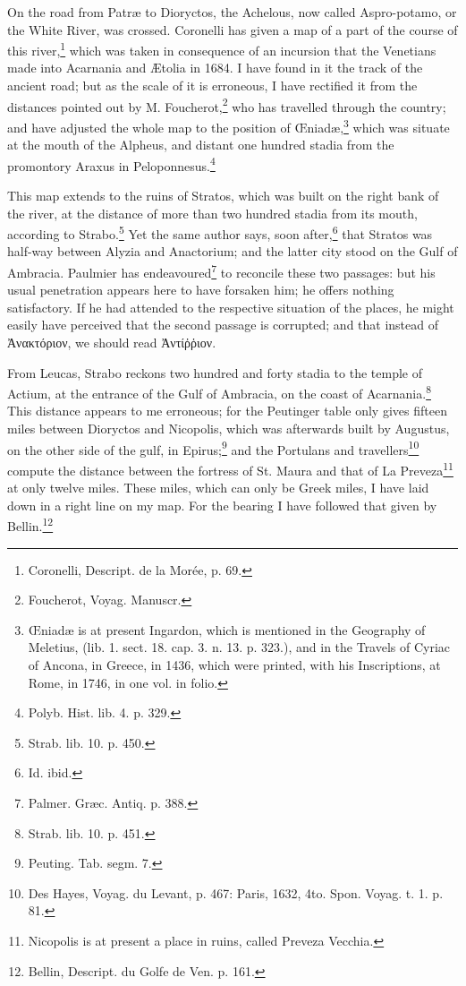 \documentclass[a4paper, 11pt, oneside, polutonikogreek, english]{article}
\begin{document}
On the road from Patræ to Dioryctos, the Achelous, now called Aspro-potamo, or the White River, was crossed. Coronelli has given a map of a part of the course of this river,\footnote{Coronelli, Descript. de la Morée, p. 69.} which was taken in consequence of an incursion that the Venetians made into Acarnania and Ætolia in 1684. I have found in it the track of the ancient road; but as the scale of it is erroneous, I have rectified it from the distances pointed out by M. Foucherot,\footnote{Foucherot, Voyag. Manuscr.} who has travelled through the country; and have adjusted the whole map to the position of Œniadæ,\footnote{Œniadæ is at present Ingardon, which is mentioned in the Geography of Meletius, (lib. 1. sect. 18. cap. 3. n. 13. p. 323.), and in the Travels of Cyriac of Ancona, in Greece, in 1436, which were printed, with his Inscriptions, at Rome, in 1746, in one vol. in folio.} which was situate at the mouth of the Alpheus, and distant one hundred stadia from the promontory Araxus in Peloponnesus.\footnote{Polyb. Hist. lib. 4. p. 329.}

This map extends to the ruins of Stratos, which was built on the right bank of the river, at the distance of more than two hundred stadia from its mouth, according to Strabo.\footnote{Strab. lib. 10. p. 450.} Yet the same author says, soon after,\footnote{Id. ibid.} that Stratos was half-way between Alyzia and Anactorium; and the latter city stood on the Gulf of Ambracia. Paulmier has endeavoured\footnote{Palmer. Græc. Antiq. p. 388.} to reconcile these two passages: but his usual penetration appears here to have forsaken him; he offers nothing satisfactory. If he had attended to the respective situation of the places, he might easily have perceived that the second passage is corrupted; and that instead of Ἀνακτόριον, we should read Ἀντίῤῥιον.

From Leucas, Strabo reckons two hundred and forty stadia to the temple of Actium, at the entrance of the Gulf of Ambracia, on the coast of Acarnania.\footnote{Strab. lib. 10. p. 451.} This distance appears to me erroneous; for the Peutinger table only gives fifteen miles between Dioryctos and Nicopolis, which was afterwards built by Augustus, on the other side of the gulf, in Epirus;\footnote{Peuting. Tab. segm. 7.} and the Portulans and travellers\footnote{Des Hayes, Voyag. du Levant, p. 467: Paris, 1632, 4to. Spon. Voyag. t. 1. p. 81.} compute the distance between the fortress of St. Maura and that of La Preveza\footnote{Nicopolis is at present a place in ruins, called Preveza Vecchia.} at only twelve miles. These miles, which can only be Greek miles, I have laid down in a right line on my map. For the bearing I have followed that given by Bellin.\footnote{Bellin, Descript. du Golfe de Ven. p. 161.}
\end{document}

